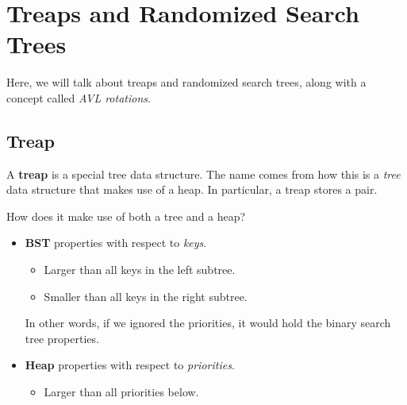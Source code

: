 \documentclass[letterpaper]{article}
\begin{document}
\newpage 
\section{Treaps and Randomized Search Trees}
Here, we will talk about treaps and randomized search trees, along with a concept called \emph{AVL rotations}.

\subsection{Treap}
A \textbf{treap} is a special tree data structure. The name comes from how this is a \emph{tree} data structure that makes use of a heap. In particular, a treap stores a  pair. 

\bigskip 

How does it make use of both a tree and a heap? 
\begin{itemize}
    \item \textbf{BST} properties with respect to \emph{keys}.
    \begin{itemize}
        \item Larger than all keys in the left subtree. 
        \item Smaller than all keys in the right subtree. 
    \end{itemize}
    In other words, if we ignored the priorities, it would hold the binary search tree properties. 

    \item \textbf{Heap} properties with respect to \emph{priorities}. 
    \begin{itemize}
        \item Larger than all priorities below. 
    \end{itemize}
\end{itemize}
\end{document}
